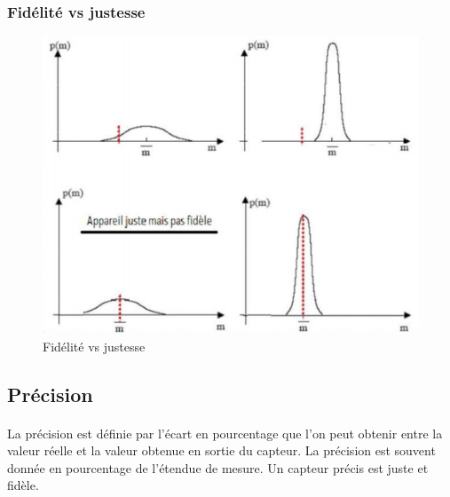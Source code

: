 \documentclass{article}
\begin{document}
            \subsubsection{Fidélité vs justesse}
            \begin{figure}[H]
                \centering
                \includegraphics[width=0.6\linewidth]{./images/001-fidelite-vs-justesse.png}
                \caption{Fidélité vs justesse}
                \label{fig:fidelite-vs-justesse}
            \end{figure}

        \subsection{Précision}
            \paragraph{}
            La précision est définie par l'écart en pourcentage que l'on peut obtenir entre la valeur réelle et la valeur obtenue en sortie du capteur. La précision est souvent donnée en pourcentage de l'étendue de mesure. Un capteur précis est juste et fidèle.
\end{document}
